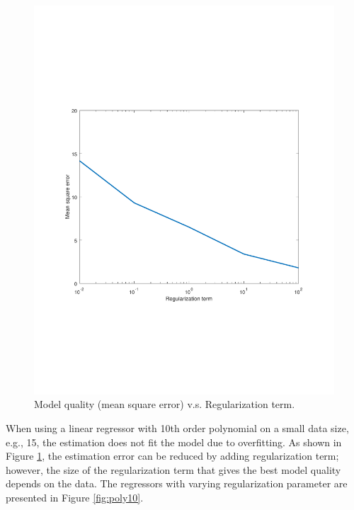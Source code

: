 \documentclass[]{article}
\begin{document}
\begin{figure}[ht]
	\centering
	\includegraphics[trim= 10cm 5cm 10cm 5cm, scale=0.4]{proj1-3_2b-mseVSregul}
	\caption{Model quality (mean square error) v.s. Regularization term.}
	\label{fig:mseVSregul}
\end{figure}
When using a linear regressor with 10th order polynomial on a small data size, e.g., 15, the estimation does not fit the model due to overfitting. As shown in Figure \ref{fig:mseVSregul}, the estimation error can be reduced by adding regularization term; however, the size of the regularization term that gives the best model quality depends on the data. The regressors with varying regularization parameter are presented in Figure \ref{fig:poly10}.
\end{document}
